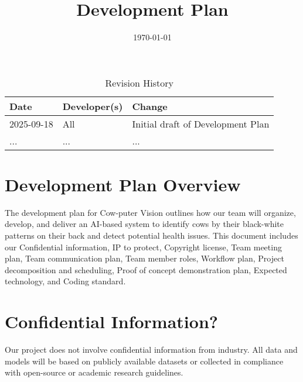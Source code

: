 \documentclass{article}
\title{Development Plan\\\progname}
\author{\authname}
\date{\today}
\newcommand{\progname}{Cow-puter Vision} %
\begin{document}
\maketitle

\begin{table}[hp]
\caption{Revision History} \label{TblRevisionHistory}
\begin{tabularx}{\textwidth}{llX}
\toprule
\textbf{Date} & \textbf{Developer(s)} & \textbf{Change}\\
\midrule
2025-09-18 & All & Initial draft of Development Plan \\
... & ... & ...\\
\bottomrule
\end{tabularx}
\end{table}

\newpage{}


\section{Development Plan Overview}
The development plan for \progname{} outlines how our team will organize, develop, 
and deliver an AI-based system to identify cows by their black-white patterns on their back 
and detect potential health issues. This document includes our Confidential information, 
IP to protect, Copyright license, Team meeting plan, Team communication plan, Team member 
roles, Workflow plan, Project decomposition and scheduling, Proof of concept demonstration 
plan, Expected technology, and Coding standard.


\section{Confidential Information?}


Our project does not involve confidential information from industry. 
All data and models will be based on publicly available datasets or 
collected in compliance with open-source or academic research guidelines.
\end{document}
